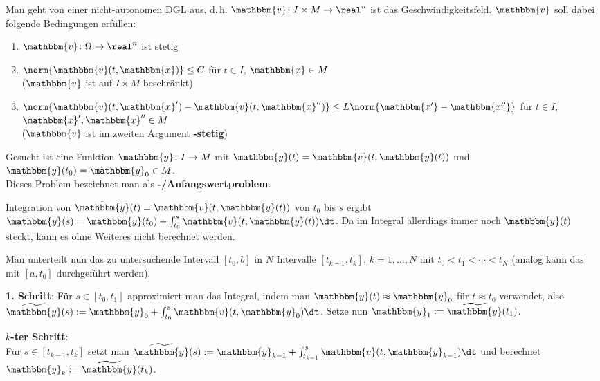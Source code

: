 Man geht von einer nicht-autonomen DGL aus, d.\,h.
$\mathbbm{v}\colon I \times M \rightarrow \real^n$
ist das Geschwindigkeitsfeld.
$\mathbbm{v}$ soll dabei folgende Bedingungen erfüllen:
\begin{enumerate}
    \item
    $\mathbbm{v}\colon \Omega \rightarrow \real^n$ ist stetig

    \item
    $\norm{\mathbbm{v}(t, \mathbbm{x})} \le C$ für
    $t \in I$, $\mathbbm{x} \in M$ \\
    ($\mathbbm{v}$ ist auf $I \times M$ beschränkt)

    \item
    $\norm{\mathbbm{v}(t, \mathbbm{x}') - \mathbbm{v}(t, \mathbbm{x}'')} \le
    L \norm{\mathbbm{x'} - \mathbbm{x''}}$ für
    $t \in I$, $\mathbbm{x}', \mathbbm{x}'' \in M$ \\
    ($\mathbbm{v}$ ist im zweiten Argument \textbf{-stetig})
\end{enumerate}
Gesucht ist eine Funktion $\mathbbm{y}\colon I \rightarrow M$
mit $\dot{\mathbbm{y}}(t) = \mathbbm{v}(t, \mathbbm{y}(t))$
und $\mathbbm{y}(t_0) = \mathbbm{y}_0 \in M$. \\
Dieses Problem bezeichnet man als \textbf{-/Anfangswertproblem}.

\linie
\pagebreak

Integration von $\dot{\mathbbm{y}}(t) = \mathbbm{v}(t, \mathbbm{y}(t))$
von $t_0$ bis $s$ ergibt
$\mathbbm{y}(s) = \mathbbm{y}(t_0) +
\int_{t_0}^s \mathbbm{v}(t, \mathbbm{y}(t))\dt$.
Da im Integral allerdings immer noch $\mathbbm{y}(t)$ steckt, kann es ohne
Weiteres nicht berechnet werden.

Man unterteilt nun das zu untersuchende Intervall $[t_0, b]$ in $N$ Intervalle
$[t_{k-1}, t_k]$, $k = 1, \dotsc, N$ mit $t_0 < t_1 < \dotsb < t_N$
(analog kann das mit $[a, t_0]$ durchgeführt werden).

\textbf{1. Schritt}:
Für $s \in [t_0, t_1]$ approximiert man das Integral, indem man
$\mathbbm{y}(t) \approx \mathbbm{y}_0$ für $t \approx t_0$ verwendet, also
$\widetilde{\mathbbm{y}}(s) := \mathbbm{y}_0 +
\int_{t_0}^s \mathbbm{v}(t, \mathbbm{y}_0)\dt$.
Setze nun $\mathbbm{y}_1 := \widetilde{\mathbbm{y}}(t_1)$.

\textbf{$k$-ter Schritt}: \\
Für $s \in [t_{k-1}, t_k]$ setzt man
$\widetilde{\mathbbm{y}}(s) := \mathbbm{y}_{k-1} +
\int_{t_{k-1}}^s \mathbbm{v}(t, \mathbbm{y}_{k-1})\dt$
und berechnet $\mathbbm{y}_k := \widetilde{\mathbbm{y}}(t_k)$.

